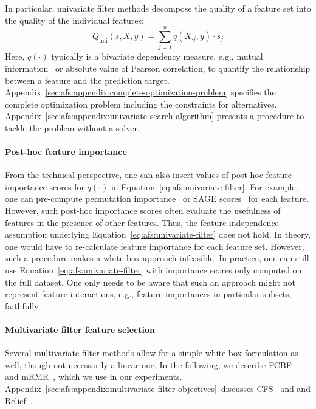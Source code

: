 \documentclass{article}
\theoremstyle{definition}
\begin{document}
In particular, univariate filter methods decompose the quality of a feature set into the quality of the individual features:
%
\begin{equation}
	Q_{\text{uni}}(s,X,y) = \sum_{j=1}^{n} q(X_{\cdot{}j},y) \cdot s_j
	\label{eq:afs:univariate-filter}
\end{equation}
%
Here, $q(\cdot)$ typically is a bivariate dependency measure, e.g., mutual information~\cite{kraskov2004estimating} or absolute value of Pearson correlation, to quantify the relationship between a feature and the prediction target.
Appendix~\ref{sec:afs:appendix:complete-optimization-problem} specifies the complete optimization problem including the constraints for alternatives.
Appendix~\ref{sec:afs:appendix:univariate-search-algorithm} presents a procedure to tackle the problem without a solver.

\paragraph{Post-hoc feature importance}

From the technical perspective, one can also insert values of post-hoc feature-importance scores for $q(\cdot)$ in Equation~\ref{eq:afs:univariate-filter}.
For example, one can pre-compute permutation importance~\cite{breiman2001random} or SAGE scores~\cite{covert2020understanding} for each feature.
However, such post-hoc importance scores often evaluate the usefulness of features in the presence of other features.
Thus, the feature-independence assumption underlying Equation~\ref{eq:afs:univariate-filter} does not hold.
In theory, one would have to re-calculate feature importance for each feature set.
However, such a procedure makes a white-box approach infeasible.
In practice, one can still use Equation~\ref{eq:afs:univariate-filter} with importance scores only computed on the full dataset.
One only needs to be aware that such an approach might not represent feature interactions, e.g., feature importances in particular subsets, faithfully.

\paragraph{Multivariate filter feature selection}

Several multivariate filter methods allow for a simple white-box formulation as well, though not necessarily a linear one.
In the following, we describe FCBF~\cite{yu2003feature} and mRMR~\cite{peng2005feature}, which we use in our experiments.
Appendix~\ref{sec:afs:appendix:multivariate-filter-objectives}~discusses CFS~\cite{hall1999correlation, hall2000correlation} and and Relief~\cite{kira1992feature, robnik1997adaptation}.
\end{document}
